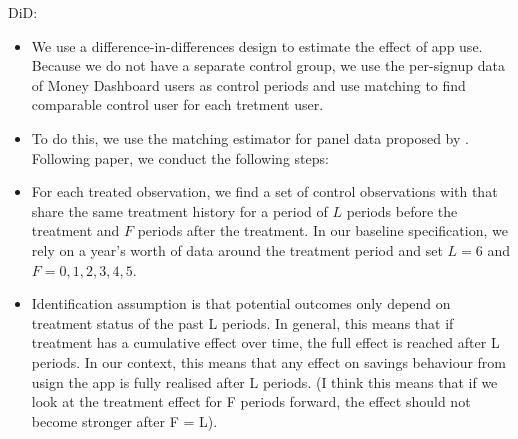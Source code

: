 DiD:
\begin{itemize}

    \item We use a difference-in-differences design to estimate the effect of
        app use. Because we do not have a separate control group, we use the
        per-signup data of Money Dashboard users as control periods and use
        matching to find comparable control user for each tretment user.

    \item To do this, we use the matching estimator for panel data proposed by
        \citet{imai2021matching}. Following paper, we conduct the following
        steps:

    \item For each treated observation, we find a set of control observations
        with that share the same treatment history for a period of $L$ periods
        before the treatment and $F$ periods after the treatment. In our
        baseline specification, we rely on a year's worth of data around the
        treatment period and set $L=6$ and $F = 0, 1, 2, 3, 4, 5$.

    \item Identification assumption is that potential outcomes only depend on
        treatment status of the past L periods. In general, this means that if
        treatment has a cumulative effect over time, the full effect is reached
        after L periods. In our context, this means that any effect on savings
        behaviour from usign the app is fully realised after L periods. (I
        think this means that if we look at the treatment effect for F periods
        forward, the effect should not become stronger after F = L).

\end{itemize}


